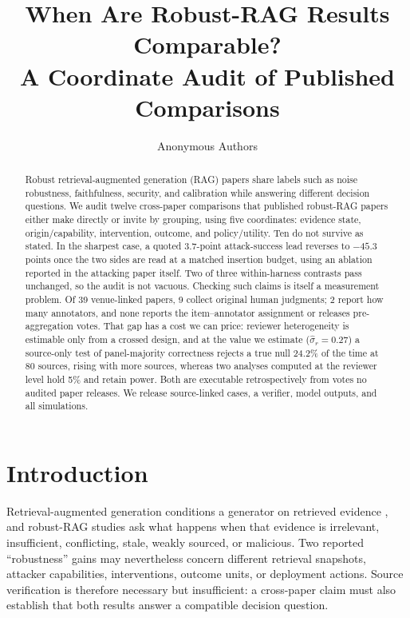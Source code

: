 \documentclass[11pt]{article}
\title{When Are Robust-RAG Results Comparable?\\
A Coordinate Audit of Published Comparisons}
\author{Anonymous Authors}
\date{}
\begin{document}
\maketitle

\begin{abstract}
Robust retrieval-augmented generation (RAG) papers share labels such as noise
robustness, faithfulness, security, and calibration while answering different
decision questions. We audit twelve cross-paper comparisons that published
robust-RAG papers either make directly or invite by grouping, using five
coordinates: evidence state, origin/capability, intervention, outcome, and
policy/utility. Ten do not survive as stated. In the sharpest case, a quoted
$3.7$-point attack-success lead reverses to $-45.3$ points once the two sides
are read at a matched insertion budget, using an ablation reported in the
attacking paper itself. Two of three within-harness contrasts pass unchanged,
so the audit is not vacuous. Checking such claims is itself a measurement problem. Of 39
venue-linked papers, 9 collect original human judgments; 2 report how many
annotators, and none reports the item--annotator assignment or releases
pre-aggregation votes. That gap has a cost we can price: reviewer
heterogeneity is estimable only from a crossed design, and at the value we
estimate ($\hat\sigma_r=0.27$) a source-only test of panel-majority
correctness rejects a true null 24.2\% of the time at 80 sources, rising with
more sources, whereas two analyses computed at the reviewer level hold 5\% and
retain power. Both are executable retrospectively from votes no audited paper
releases. We release source-linked cases, a verifier, model outputs, and all
simulations.
\end{abstract}

\section{Introduction}

Retrieval-augmented generation conditions a generator on retrieved evidence
\citep{lewis2020rag,dpr2020,realm2020}, and robust-RAG studies ask what happens
when that evidence is irrelevant, insufficient, conflicting, stale, weakly
sourced, or malicious. Two reported ``robustness'' gains may
nevertheless concern different retrieval snapshots, attacker capabilities,
interventions, outcome units, or deployment actions. Source verification is
therefore necessary but insufficient: a cross-paper claim must also establish
that both results answer a compatible decision question.
\end{document}
